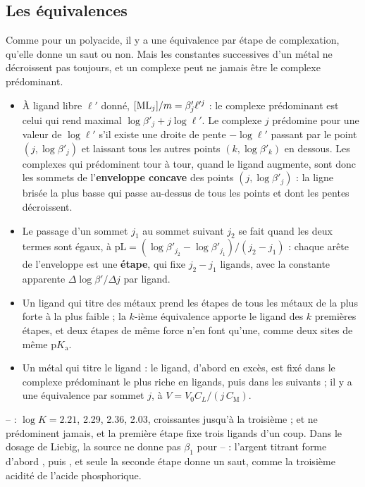 \documentclass[a4paper,11pt]{article}
\newcommand\logo[1]{\hspace{-12pt}\makebox[12pt][l]{#1}}
\newcommand\rmqphys[1]{\begin{tcolorbox}[rmq, bleu]\logo{\faLightbulb}#1\end{tcolorbox}}
\newcommand\gras[1]{\textbf{#1}}
\newcommand\pL{\ensuremath{\mathrm{pL}}\xspace}
\newcommand\pKa{\ensuremath{\mathrm{p}K_\mathrm{a}}\xspace}
\newcommand\pare[1]{\left(#1\right)}
\begin{document}
\subsection{Les équivalences}
Comme pour un polyacide, il y a une équivalence par étape de complexation, qu'elle donne un saut ou non.
Mais les constantes successives d'un métal ne décroissent pas toujours, et un complexe peut ne jamais être le complexe prédominant.
\begin{itemize}
\item À ligand libre $\ell'$ donné, $[\ce{ML}_j]/m=\beta'_j\ell'^j$ : le complexe prédominant est celui qui rend maximal $\log\beta'_j+j\log\ell'$.
Le complexe $j$ prédomine pour une valeur de $\log\ell'$ s'il existe une droite de pente $-\log\ell'$ passant par le point $(j,\log\beta'_j)$ et laissant tous les autres points $(k,\log\beta'_k)$ en dessous.
Les complexes qui prédominent tour à tour, quand le ligand augmente, sont donc les sommets de l'\gras{enveloppe concave} des points $(j,\log\beta'_j)$ : la ligne brisée la plus basse qui passe au-dessus de tous les points et dont les pentes décroissent.
\item Le passage d'un sommet $j_1$ au sommet suivant $j_2$ se fait quand les deux termes sont égaux, à $\pL=\pare{\log\beta'_{j_2}-\log\beta'_{j_1}}/\pare{j_2-j_1}$ : chaque arête de l'enveloppe est une \gras{étape}, qui fixe $j_2-j_1$ ligands, avec la constante apparente $\Delta\log\beta'/\Delta j$ par ligand.
\item Un ligand qui titre des métaux prend les étapes de tous les métaux de la plus forte à la plus faible ; la $k$-ième équivalence apporte le ligand des $k$ premières étapes, et deux étapes de même force n'en font qu'une, comme deux sites de même \pKa.
\item Un métal qui titre le ligand : le ligand, d'abord en excès, est fixé dans le complexe prédominant le plus riche en ligands, puis dans les suivants ; il y a une équivalence par sommet $j$, à $V=V_0C_L/\pare{j\,C_\mathrm M}$.
\end{itemize}
\rmqphys{– : $\log K=\num{2,21}$, \num{2,29}, \num{2,36}, \num{2,03}, croissantes jusqu'à la troisième ; \ce{Zn(NH3)^2+} et \ce{Zn(NH3)2^2+} ne prédominent jamais, et la première étape fixe trois ligands d'un coup.
Dans le dosage de Liebig, la source ne donne pas $\beta_1$ pour \ce{Ag}–\ce{CN-} : l'argent titrant forme d'abord \ce{Ag(CN)3^2-}, puis \ce{Ag(CN)2-}, et seule la seconde étape donne un saut, comme la troisième acidité de l'acide phosphorique.}
\end{document}
